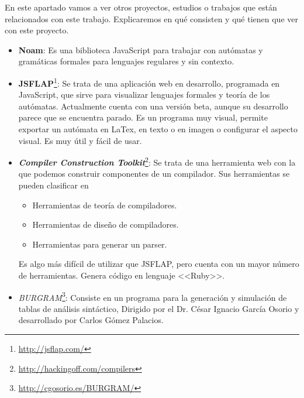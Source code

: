 
En este apartado vamos a ver otros proyectos, estudios o trabajos que están relacionados con este trabajo. Explicaremos en qué consisten y qué tienen que ver con este proyecto.

\begin{itemize}

\item \textbf{Noam}: Es una biblioteca JavaScript para trabajar con autómatas y gramáticas formales para lenguajes regulares y sin contexto.

\item \textbf{JSFLAP}\footnote{\url{http://jsflap.com/}}: Se trata de una aplicación web en desarrollo, programada en JavaScript, que sirve para visualizar lenguajes formales y teoría de los autómatas. Actualmente cuenta con una versión beta, aunque su desarrollo parece que se encuentra parado. Es un programa muy visual, permite exportar un autómata en LaTex, en texto o en imagen o configurar el aspecto visual. Es muy útil y fácil de usar.


\item \emph{\textbf{Compiler Construction Toolkit}}\footnote{\url{http://hackingoff.com/compilers}}: Se trata de una herramienta web con la que podemos construir componentes de un compilador. Sus herramientas se pueden clasificar en
\begin{itemize}
\item Herramientas de teoría de compiladores.
\item Herramientas de diseño de compiladores.
\item Herramientas para generar un parser.
\end{itemize}
Es algo más difícil de utilizar que JSFLAP, pero cuenta con un mayor número de herramientas. Genera código en lenguaje <<Ruby>>.

\item \emph{BURGRAM}\footnote{\url{http://cgosorio.es/BURGRAM/}}: Consiste en un programa para la generación y simulación de tablas de análisis sintáctico, Dirigido por el Dr. César Ignacio García Osorio y desarrollado por Carlos Gómez Palacios.
\end{itemize}